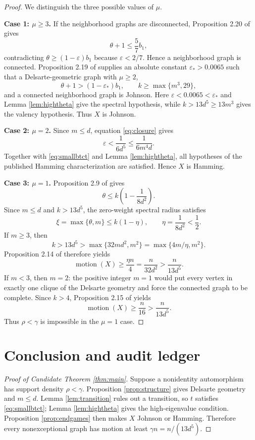 \documentclass[11pt]{amsart}
\theoremstyle{definition}
\newcommand{\mot}{\operatorname{motion}}
\newcommand{\eps}{\varepsilon}
\newcommand{\gam}{\gamma}
\begin{document}
\begin{proof}
We distinguish the three possible values of $\mu$.

\smallskip
\noindent\textbf{Case 1: $\mu\ge3$.}
If the neighborhood graphs are disconnected, Proposition 2.20 of \cite{PS} gives
\[
 \theta+1\le\frac57b_1,
\]
contradicting $\theta\ge(1-\eps)b_1$ because $\eps<2/7$.  Hence a neighborhood graph is connected.  Proposition 2.19 of \cite{PS} supplies an absolute constant $\eps_*>0.0065$ such that a Delsarte-geometric graph with $\mu\ge2$,
\[
 \theta+1>(1-\eps_*)b_1,
 \qquad
 k\ge\max\{m^3,29\},
\]
and a connected neighborhood graph is Johnson.  Here $\eps<0.0065<\eps_*$ and Lemma \ref{lem:hightheta} give the spectral hypothesis, while $k>13d^5\ge13m^3$ gives the valency hypothesis.  Thus $X$ is Johnson.

\smallskip
\noindent\textbf{Case 2: $\mu=2$.}
Since $m\le d$, equation \eqref{eq:closure} gives
\[
 \eps<\frac1{6d^5}\le\frac1{6m^4d}.
\]
Together with \eqref{eq:smallbtct} and Lemma \ref{lem:hightheta}, all hypotheses of the published Hamming characterization \cite[Proposition 2.21]{PS} are satisfied.  Hence $X$ is Hamming.

\smallskip
\noindent\textbf{Case 3: $\mu=1$.}
Proposition 2.9 of \cite{PS} gives
\[
 \theta\le k\left(1-\frac1{8d^2}\right).
\]
Since $m\le d$ and $k>13d^5$, the zero-weight spectral radius satisfies
\[
 \xi=\max\{\theta,m\}\le k(1-\eta),
 \qquad
 \eta=\frac1{8d^2}<\frac12.
\]
If $m\ge3$, then
\[
 k>13d^5>\max\{32md^2,m^2\}
 =\max\{4m/\eta,m^2\}.
\]
Proposition 2.14 of \cite{PS} therefore yields
\[
 \mot(X)\ge\frac{\eta n}{4}=\frac{n}{32d^2}>\frac{n}{13d^5}.
\]
If $m<3$, then $m=2$: the positive integer $m=1$ would put every vertex in exactly one clique of the Delsarte geometry and force the connected graph to be complete.  Since $k>4$, Proposition 2.15 of \cite{PS} yields
\[
 \mot(X)\ge\frac n{16}>\frac{n}{13d^5}.
\]
Thus $\rho<\gam$ is impossible in the $\mu=1$ case.
\end{proof}

\section{Conclusion and audit ledger}
\begin{proof}[Proof of Candidate Theorem \ref{thm:main}]
Suppose a nonidentity automorphism has support density $\rho<\gam$.  Proposition \ref{prop:structure} gives Delsarte geometry and $m\le d$.  Lemma \ref{lem:transition} rules out a transition, so $t$ satisfies \eqref{eq:smallbtct}; Lemma \ref{lem:hightheta} gives the high-eigenvalue condition.  Proposition \ref{prop:endgames} then makes $X$ Johnson or Hamming.  Therefore every nonexceptional graph has motion at least $\gam n=n/(13d^5)$.
\end{proof}
\end{document}
